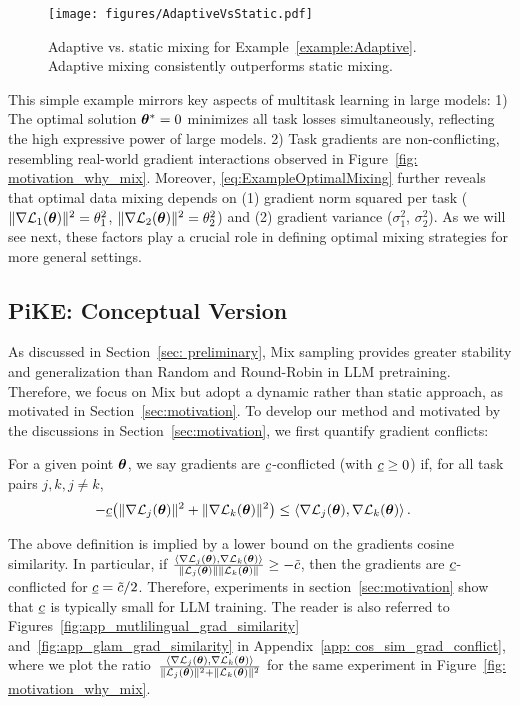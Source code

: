 \begin{figure}[!tb]  
\vskip 0.2in  
\begin{center}  
\centerline{\texttt{[image: figures/AdaptiveVsStatic.pdf]}}  
\caption{Adaptive vs. static mixing for Example~\ref{example:Adaptive}. Adaptive mixing consistently outperforms static mixing.}  
\label{fig: ExampleAdaptiveMixingVsStatic}  
\end{center}  
\end{figure}  

This simple example mirrors key aspects of multitask learning in large models:  
1) The optimal solution \(\bm{\theta}^* = 0\) minimizes all task losses simultaneously, reflecting the high expressive power of large models.  
2) Task gradients are  non-conflicting, resembling real-world gradient interactions observed in Figure~\ref{fig: motivation_why_mix}.  Moreover, \eqref{eq:ExampleOptimalMixing} further reveals that optimal data mixing depends on (1) gradient norm squared per task (\(\|\nabla \mathcal{L}_1(\bm{\theta})\|^2 = \theta_1^2\), \(\|\nabla \mathcal{L}_2(\bm{\theta})\|^2 = \theta_2^2\)) and (2) gradient variance (\(\sigma_1^2\), \(\sigma_2^2\)). As we will see next, these factors play a crucial role in defining optimal mixing strategies for more general settings.




\subsection{PiKE: Conceptual Version}
As discussed in Section~\ref{sec: preliminary}, Mix sampling provides greater stability and generalization than Random and Round-Robin in LLM pretraining. Therefore, we focus on Mix but adopt a dynamic rather than static approach, as motivated in Section~\ref{sec:motivation}.
To develop our method and motivated by the discussions in Section~\ref{sec:motivation}, we first quantify gradient conflicts:


\begin{definition}\label{def:Interaction_LB}
    For a given point $\bm{\theta}$, we say gradients are $\underline{c}$-conflicted (with $\underline{c}\geq 0$) if, for all task pairs $j,k, j\neq k$,
    \begin{align}
          -\underline{c} \big(\|\nabla \mathcal{L}_j(\bm{\theta})\|^2 + \|\nabla \mathcal{L}_k(\bm{\theta})\|^2\big) &\leq  \left\langle \nabla \mathcal{L}_j(\bm{\theta}) ,\nabla \mathcal{L}_k(\bm{\theta}) \right\rangle.  \nonumber 
    \end{align}
\end{definition}
The above definition is implied by a lower bound on the gradients cosine similarity. In particular, if $\frac{\left\langle \nabla \mathcal{L}_j(\bm{\theta}) ,\nabla \mathcal{L}_k(\bm{\theta}) \right\rangle}{\|\mathcal{L}_j(\bm{\theta}) \|\|\mathcal{L}_k(\bm{\theta}) \|} \geq -\tilde{c}$, then the gradients are $\underline{c}$-conflicted for $\underline{c} = \tilde{c}/2$. 
Therefore, experiments in section~\ref{sec:motivation} show that $\underline{c}$ is typically small for LLM training. The reader is also referred to Figures~\ref{fig:app_mutlilingual_grad_similarity} and~\ref{fig:app_glam_grad_similarity} in Appendix~\ref{app: cos_sim_grad_conflict}, where we plot the ratio~$\frac{\left\langle \nabla \mathcal{L}_j(\bm{\theta}) ,\nabla \mathcal{L}_k(\bm{\theta}) \right\rangle}{\|\mathcal{L}_j(\bm{\theta}) \|^2+\|\mathcal{L}_k(\bm{\theta}) \|^2}$  for the same experiment  in Figure~\ref{fig: motivation_why_mix}. 

